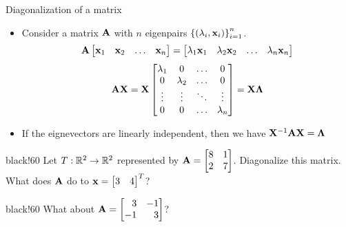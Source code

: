 \documentclass[aspectratio=169]{beamer}
\def\mf{\ensuremath\mathbf}
\def\mb{\ensuremath\mathbb}
\def\bmx{\ensuremath\begin{bmatrix*}[r]}
\def\emx{\ensuremath\end{bmatrix*}}
\newcommand{\demoex}[2]{\onslide<#1->\begin{color}{black!60} #2 \end{color}}
\begin{document}
\begin{frame}[t]{Diagonalization of a matrix}
\begin{itemize}
    \item Consider a matrix $\mf{A}$ with $n$ eigenpairs $\left\{\left(\lambda_i, \mf{x}_i\right)\right\}_{i=1}^n$.
    \[ \mf{A}\begin{bmatrix*}\mf{x}_1 & \mf{x}_2 & \ldots & \mf{x}_n\end{bmatrix*} = \begin{bmatrix*}\lambda_1\mf{x}_1 & \lambda_2\mf{x}_2 & \ldots & \lambda_n\mf{x}_n\end{bmatrix*} \]
    \[ \mf{AX} = \mf{X}\begin{bmatrix*}\lambda_1 & 0 & \ldots & 0\\0 & \lambda_2 & \ldots & 0\\\vdots & \vdots & \ddots & \vdots\\0 & 0 & \ldots & \lambda_n\end{bmatrix*} = \mf{X}\mf{\Lambda} \]

    \item If the eignevectors are linearly independent, then we have $\mf{X}^{-1}\mf{A}\mf{X} = \mf{\Lambda}$
\end{itemize}

\demoex{2}{
    Let $T: \mb{R}^2 \to \mb{R}^2$ represented by $\mf{A} = \bmx 8 & 1\\2 & 7\emx$. Diagonalize this matrix. What does $\mf{A}$ do to $\mf{x} = \bmx 3 & 4\emx^T$?
}\vspace{0.2cm}

\demoex{3}{
    What about $\mf{A} = \bmx 3 & -1\\-1 & 3\emx$?
}
\end{frame}
\end{document}
